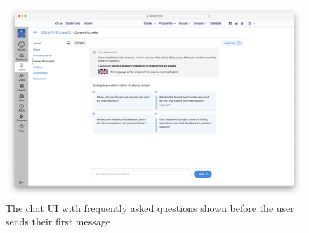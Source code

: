 \begin{figure}[H]
    \centering
    \includegraphics[width=\textwidth]{content/figures/assets/18-faq-questions.png}
    \caption{The chat UI with frequently asked questions shown before the user sends their first message}
    \label{fig:faq_questions}
\end{figure}
